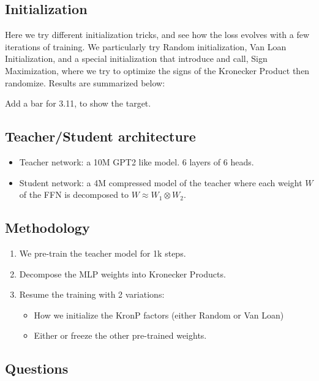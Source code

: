 \documentclass{article}
\begin{document}
{\subsection{Initialization}%
\label{sub:Initialization}

Here we try different initialization tricks, and see how the loss evolves with a few iterations of training. We particularly try Random initialization, Van Loan Initialization, and a special initialization that introduce and call, Sign Maximization, where we try to optimize the signs of the Kronecker Product then randomize. Results are summarized below:


Add a bar for 3.11, to show the target.

\subsection{Teacher/Student architecture}

\begin{itemize}

\item Teacher network:   a 10M GPT2 like model. 6 layers of 6 heads.
\item Student network:  a 4M compressed model of the teacher where each weight  $W$ of the FFN is decomposed to $W \approx W_1 \otimes W_2$. 

\end{itemize}

\subsection{Methodology}%
\label{sub:Methodology}

\begin{enumerate}
	\item  We pre-train the teacher model for 1k steps.
	\item  Decompose the MLP weights into Kronecker Products.
	\item  Resume the training with 2 variations:
	\begin{itemize}
		\item How we initialize the KronP factors (either Random or Van Loan)
		\item Either or freeze the other pre-trained weights.
	\end{itemize}
\end{enumerate}



\subsection{Questions}%
\label{sub:Questions}


}
\end{document}
